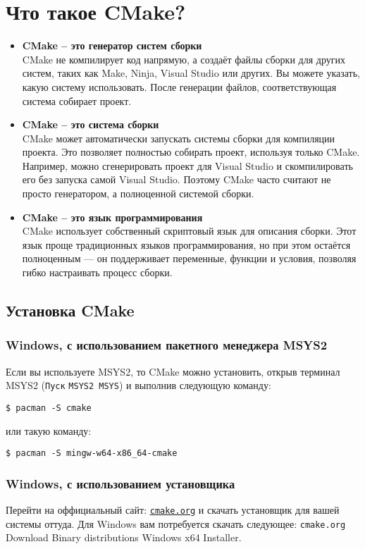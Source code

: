 \documentclass{article}
\begin{document}
\newpage
\section{Что такое CMake?}
\begin{itemize}
\item \textbf{CMake -- это генератор систем сборки}\\
CMake не компилирует код напрямую, а создаёт файлы сборки для других систем, таких как Make, Ninja, Visual Studio или других. Вы можете указать, какую систему использовать. После генерации файлов, соответствующая система собирает проект.
\item \textbf{CMake -- это система сборки}\\
CMake может автоматически запускать системы сборки для компиляции проекта. Это позволяет полностью собирать проект, используя только CMake. Например, можно сгенерировать проект для Visual Studio и скомпилировать его без запуска самой Visual Studio. Поэтому CMake часто считают не просто генератором, а полноценной системой сборки.
\item \textbf{CMake -- это язык программирования}\\
CMake использует собственный скриптовый язык для описания сборки. Этот язык проще традиционных языков программирования, но при этом остаётся полноценным — он поддерживает переменные, функции и условия, позволяя гибко настраивать процесс сборки.
\end{itemize}

\subsection*{Установка CMake}

\subsubsection*{Windows, с использованием пакетного менеджера MSYS2}
Если вы используете MSYS2, то CMake можно установить, открыв  терминал MSYS2 (\texttt{Пуск}  \textrightarrow{} \texttt{MSYS2 MSYS}) и выполнив следующую команду:
\begin{verbatim}
$ pacman -S cmake
\end{verbatim}
или такую команду:
\begin{verbatim}
$ pacman -S mingw-w64-x86_64-cmake
\end{verbatim}

\subsubsection*{Windows, с использованием установщика}
Перейти на оффициальный сайт: \href{https://cmake.org/}{\texttt{cmake.org}} и скачать установщик для вашей системы оттуда. Для Windows вам потребуется скачать следующее:
\texttt{cmake.org} \textrightarrow{} Download \textrightarrow{} Binary distributions \textrightarrow{} Windows x64 Installer.
\end{document}
